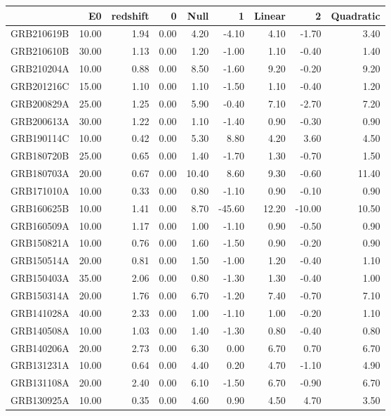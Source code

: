 \begin{tabular}{lrrrrrrrr}
\toprule
 & E0 & redshift & 0 & Null & 1 & Linear & 2 & Quadratic \\
\midrule
GRB210619B & 10.00 & 1.94 & 0.00 & 4.20 & -4.10 & 4.10 & -1.70 & 3.40 \\
GRB210610B & 30.00 & 1.13 & 0.00 & 1.20 & -1.00 & 1.10 & -0.40 & 1.40 \\
GRB210204A & 10.00 & 0.88 & 0.00 & 8.50 & -1.60 & 9.20 & -0.20 & 9.20 \\
GRB201216C & 15.00 & 1.10 & 0.00 & 1.10 & -1.50 & 1.10 & -0.40 & 1.20 \\
GRB200829A & 25.00 & 1.25 & 0.00 & 5.90 & -0.40 & 7.10 & -2.70 & 7.20 \\
GRB200613A & 30.00 & 1.22 & 0.00 & 1.10 & -1.40 & 0.90 & -0.30 & 0.90 \\
GRB190114C & 10.00 & 0.42 & 0.00 & 5.30 & 8.80 & 4.20 & 3.60 & 4.50 \\
GRB180720B & 25.00 & 0.65 & 0.00 & 1.40 & -1.70 & 1.30 & -0.70 & 1.50 \\
GRB180703A & 20.00 & 0.67 & 0.00 & 10.40 & 8.60 & 9.30 & -0.60 & 11.40 \\
GRB171010A & 10.00 & 0.33 & 0.00 & 0.80 & -1.10 & 0.90 & -0.10 & 0.90 \\
GRB160625B & 10.00 & 1.41 & 0.00 & 8.70 & -45.60 & 12.20 & -10.00 & 10.50 \\
GRB160509A & 10.00 & 1.17 & 0.00 & 1.00 & -1.10 & 0.90 & -0.50 & 0.90 \\
GRB150821A & 10.00 & 0.76 & 0.00 & 1.60 & -1.50 & 0.90 & -0.20 & 0.90 \\
GRB150514A & 20.00 & 0.81 & 0.00 & 1.50 & -1.00 & 1.20 & -0.40 & 1.10 \\
GRB150403A & 35.00 & 2.06 & 0.00 & 0.80 & -1.30 & 1.30 & -0.40 & 1.00 \\
GRB150314A & 20.00 & 1.76 & 0.00 & 6.70 & -1.20 & 7.40 & -0.70 & 7.10 \\
GRB141028A & 40.00 & 2.33 & 0.00 & 1.00 & -1.10 & 1.00 & -0.20 & 1.10 \\
GRB140508A & 10.00 & 1.03 & 0.00 & 1.40 & -1.30 & 0.80 & -0.40 & 0.80 \\
GRB140206A & 20.00 & 2.73 & 0.00 & 6.30 & 0.00 & 6.70 & 0.70 & 6.70 \\
GRB131231A & 10.00 & 0.64 & 0.00 & 4.40 & 0.20 & 4.70 & -1.10 & 4.90 \\
GRB131108A & 20.00 & 2.40 & 0.00 & 6.10 & -1.50 & 6.70 & -0.90 & 6.70 \\
GRB130925A & 10.00 & 0.35 & 0.00 & 4.60 & 0.90 & 4.50 & 4.70 & 3.50 \\

\end{tabular}
